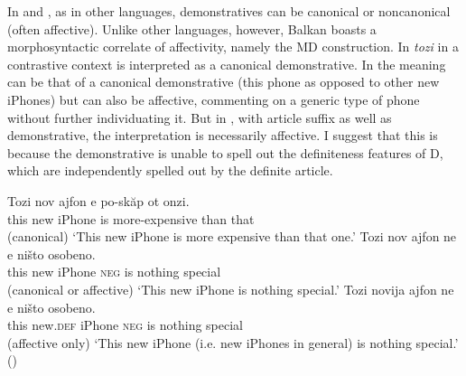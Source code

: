 \documentclass[output=paper,
colorlinks,
citecolor=brown,
newtxmath
]{langscibook}
\begin{document}
In  and , as in other languages, demonstratives can be canonical or noncanonical (often affective). Unlike other languages, however, Balkan  boasts a morphosyntactic correlate of affectivity, namely the MD construction. In  \textit{tozi} in a contrastive context is interpreted as a canonical demonstrative. In  the meaning can be that of a canonical demonstrative (this phone as opposed to other new iPhones) but can also be affective, commenting on a generic type of phone without further individuating it. But in , with article suffix as well as demonstrative, the interpretation is necessarily affective. I suggest that this is because the demonstrative is unable to spell out the definiteness features of D, which are independently spelled out by the definite article.

\ea \label{iphone} \ea \label{phone1}
\gll Tozi nov ajfon e po-skăp ot onzi. \\
this new iPhone is more-expensive than that \\\hfill (canonical)
\glt `This new iPhone is more expensive than that one.'
\ex \label{phone2}
\gll Tozi nov ajfon ne e ništo osobeno.\\
 this new iPhone \textsc{neg} is nothing special \\\hfill (canonical or affective)
 \glt `This new iPhone is nothing special.'
 \ex \label{phone3}
 \gll Tozi novija ajfon ne e ništo osobeno.\\
 this new.\textsc{def} iPhone \textsc{neg} is nothing special \\\hfill (affective only)
 \glt `This new iPhone (i.e. new iPhones in general) is nothing special.'
 \glt \hfill ()
\z \z
\end{document}
